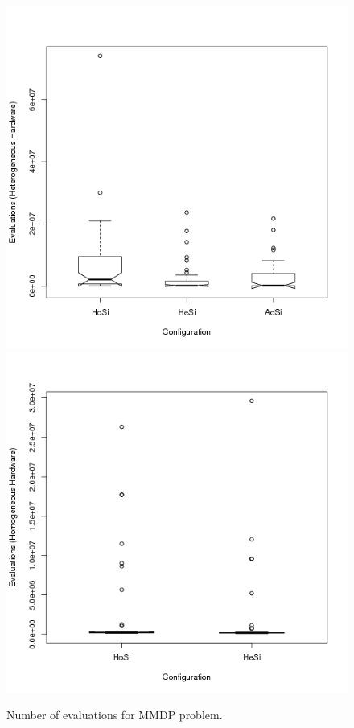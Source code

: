\begin{figure}
\centering

   \includegraphics[scale =0.4] {gfx/adaptiveresults/evalsMMDPhetero.png}
   \label{fig:subfig1}
   \includegraphics[scale =0.4] {gfx/adaptiveresults/evalsMMDPhomo.png}
   \label{fig:subfig2}
\caption{Number of evaluations for MMDP problem.}
\label{fig:evalsMMDP}
\end{figure}



